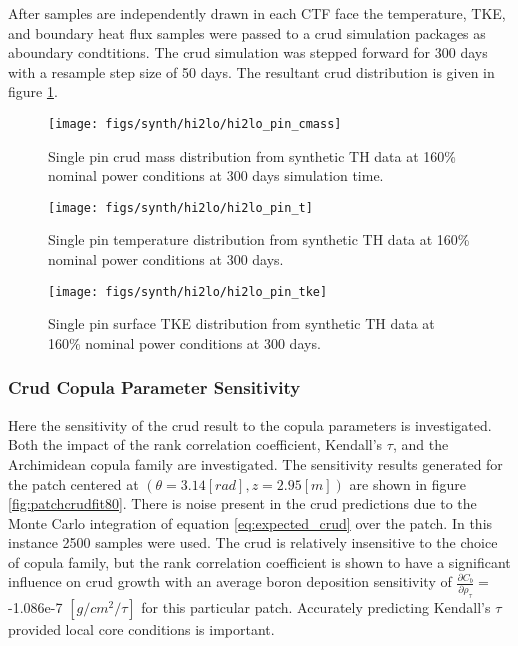 After samples are independently drawn in each CTF face the temperature, TKE, and boundary heat flux samples were passed to a crud simulation packages as aboundary condtitions.  The crud simulation was stepped forward for 300 days with a resample step size of 50 days.  The resultant crud distribution is given in figure \ref{fig:hi2lopincmass}.

\begin{figure}[H]
    \centering
    \texttt{[image: figs/synth/hi2lo/hi2lo\_pin\_cmass]}
    \caption[Single pin crud mass distribution from synthetic TH data.]{Single pin crud mass distribution from synthetic TH data at 160\% nominal power conditions at 300 days simulation time.}
    \label{fig:hi2lopincmass}
\end{figure}
\begin{figure}[H]
    \centering
    \texttt{[image: figs/synth/hi2lo/hi2lo\_pin\_t]}
    \caption{Single pin temperature distribution from synthetic TH data at 160\% nominal power conditions at 300 days.}
    \label{fig:hi2lopint}
\end{figure}
\begin{figure}[H]
    \centering
    \texttt{[image: figs/synth/hi2lo/hi2lo\_pin\_tke]}
    \caption{Single pin surface TKE distribution from synthetic TH data at 160\% nominal power conditions at 300 days.}
    \label{fig:hi2lopintke}
\end{figure}


\subsubsection{Crud Copula Parameter Sensitivity}

Here the sensitivity of the crud result to the copula parameters is investigated.  Both the impact of the rank correlation coefficient, Kendall's $\tau$, and the Archimidean copula family are investigated.  The sensitivity results generated for the patch centered at $(\theta=3.14[rad], z=2.95[m])$ are shown in figure \ref{fig:patchcrudfit80}.  There is noise present in the crud predictions due to the Monte Carlo integration of equation \ref{eq:expected_crud} over the patch.  In this instance 2500 samples were used.  The crud is relatively insensitive to the choice of copula family, but the rank correlation coefficient is shown to have a significant influence on crud growth with an average boron deposition sensitivity of $\frac{\partial C_b}{\partial \rho_\tau} =$ -1.086e-7 $[g/cm^2/\tau]$ for this particular patch.  Accurately predicting Kendall's $\tau$ provided local core conditions is important.

